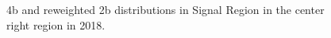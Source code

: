 \begin{figure}[ht]
 

    \caption{4b and reweighted 2b distributions in Signal Region in the center right region in 2018.}
    \label{fig:center-right-4b-SR-2018}
\end{figure}


